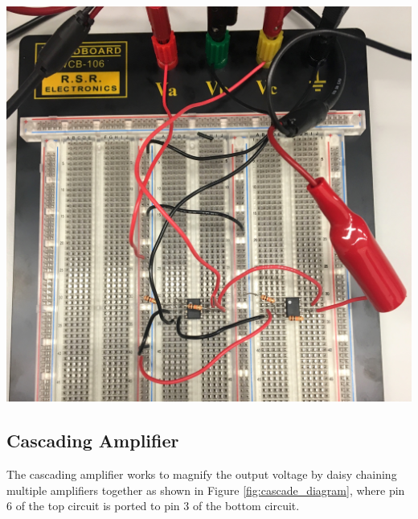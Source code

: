 \documentclass[journal]{IEEEtran}
\begin{document}
\begingroup
    \centering
    \medskip
    \includegraphics[width=\columnwidth]{images/lab7_non_inverting_circuit.jpg}
    \label{fig:non-inv_circ}
    \medskip
\endgroup




                                

\subsection{Cascading Amplifier}
\noindent The cascading amplifier works to magnify the output voltage by daisy chaining multiple amplifiers together as shown in Figure \ref{fig:cascade_diagram}, where pin 6 of the top circuit is ported to pin 3 of the bottom circuit.
\end{document}
